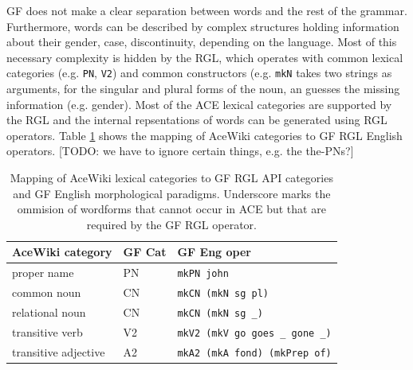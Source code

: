 \documentclass[a4paper]{article}
\def\xp#1{\texttt{#1}}
\begin{document}
GF does not make a clear separation between words and the rest of the grammar.
Furthermore, words can be described by complex structures holding information
about their gender, case, discontinuity, depending on the language. Most of
this necessary complexity is hidden by the RGL, which operates with common
lexical categories (e.g. \texttt{PN}, \texttt{V2}) and common constructors
(e.g. \texttt{mkN} takes two strings as arguments, for the singular and plural
forms of the noun, an guesses the missing information (e.g. gender).
Most of the ACE lexical categories are supported by the RGL and the internal
repsentations of words can be generated using RGL operators.
Table \ref{mapping_acewiki_to_gf} shows the mapping of AceWiki categories
to GF RGL English operators.
[TODO: we have to ignore certain things, e.g.  the the-PNs?]

\begin{table}
\begin{center}
\caption{Mapping of AceWiki lexical categories
to GF RGL API categories and GF English
morphological paradigms. Underscore marks the ommision of wordforms that
cannot occur in ACE but that are required by the GF RGL
operator.\protect\label{mapping_acewiki_to_gf}}
\begin{tabular}{ l l l }
\hline
AceWiki category & GF Cat & GF Eng oper \\
\hline
proper name & PN & \xp{mkPN john} \\
common noun & CN & \xp{mkCN (mkN sg pl)} \\
relational noun & CN & \xp{mkCN (mkN sg \_)} \\
transitive verb & V2 & \xp{mkV2 (mkV go goes \_ gone \_)} \\
transitive adjective & A2 & \xp{mkA2 (mkA fond) (mkPrep of)} \\
\hline
\end{tabular}
\end{center}
\end{table}

%
%
\end{document}
